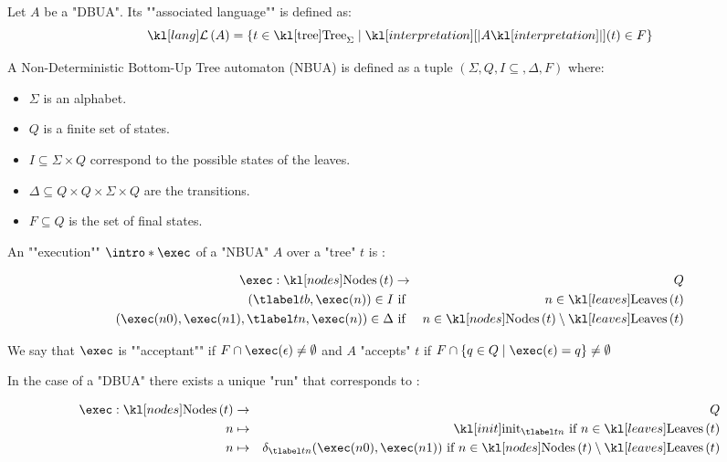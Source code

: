 \documentclass{article}
\begin{document}
\begin{definition}
	Let $A$ be a "DBUA". Its ""associated language"" is defined as:
	\[\lang A = \setdef {t \in \tree_{\Sigma}} {\interpret A (t) \in F}\]
\end{definition}

\begin{definition}
	A Non-Deterministic Bottom-Up Tree automaton (NBUA) is defined as a tuple
	$(\Sigma, Q, I \subseteq, \Delta , F )$ where:
	\begin{itemize}
		\item $\Sigma$ is an alphabet.
		\item $Q$ is a finite set of states.
		\item $I \subseteq \Sigma \times Q$ correspond to the possible states of the leaves.
		\item $\Delta \subseteq Q \times Q \times \Sigma \times Q$ are the transitions.
		\item $F \subseteq Q$ is the set of final states.
	\end{itemize}
\end{definition}


\begin{definition}
	An ""execution"" $\intro* \exec$ of a "NBUA" $A$ over a "tree" $t$ is :

	\begin{eqnarray*}
		\exec : \nodes t &\to& Q \\
		(\tlabel t b,  \exec (n) ) \in I &\text{ if }& n \in \leaves t \\
		(\exec (n0), \exec (n1), \tlabel t n, \exec (n)) \in \Delta &\text{ if }& n \in \nodes t \setminus \leaves t
	\end{eqnarray*}

	We say that $\exec$ is ""acceptant"" if $F \cap \exec (\epsilon) \neq \emptyset$ and $A$ "accepts" $t$ if
	$F \cap \setdef { q\in Q} {\exec (\epsilon) = q} \neq \emptyset$
\end{definition}

\begin{remark}
	In the case of a "DBUA" there exists a unique "run" that corresponds to :

	\begin{eqnarray*}
		\exec : \nodes t &\to & Q \\
		n  &\mapsto& \init_{\tlabel t n} \text{ if } n \in \leaves t \\
		n  &\mapsto& \delta_{\tlabel t n}(\exec (n0), \exec (n1)) \text{ if } n \in \nodes t \setminus \leaves t
	\end{eqnarray*}
\end{remark}
\end{document}
